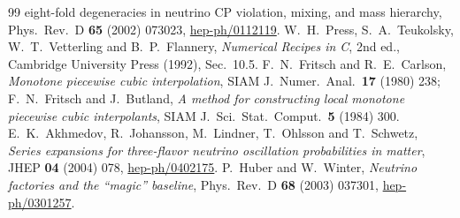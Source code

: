 \documentclass[11pt,a4paper,openany]{book}
\begin{document}
\begin{thebibliography}{99}
{  eight-fold degeneracies in neutrino CP violation, mixing, and mass hierarchy},
  Phys.\ Rev.\ D \textbf{65} (2002) 073023,
  \href{https://arxiv.org/abs/hep-ph/0112119}{hep-ph/0112119}.
 W.~H.~Press, S.~A.~Teukolsky, W.~T.~Vetterling and B.~P.~Flannery,
  \emph{Numerical Recipes in C}, 2nd ed., Cambridge University Press (1992),
  Sec.~10.5.
 F.~N.~Fritsch and R.~E.~Carlson, \emph{Monotone piecewise
  cubic interpolation}, SIAM J.\ Numer.\ Anal.\ \textbf{17} (1980) 238;
  F.~N.~Fritsch and J.~Butland, \emph{A method for constructing local monotone
  piecewise cubic interpolants}, SIAM J.\ Sci.\ Stat.\ Comput.\ \textbf{5} (1984) 300.
 E.~K.~Akhmedov, R.~Johansson, M.~Lindner, T.~Ohlsson
  and T.~Schwetz, \emph{Series expansions for three-flavor neutrino oscillation
  probabilities in matter}, JHEP \textbf{04} (2004) 078,
  \href{https://arxiv.org/abs/hep-ph/0402175}{hep-ph/0402175}.
 P.~Huber and W.~Winter, \emph{Neutrino factories and the
  ``magic'' baseline}, Phys.\ Rev.\ D \textbf{68} (2003) 037301,
  \href{https://arxiv.org/abs/hep-ph/0301257}{hep-ph/0301257}.
\end{thebibliography}
\end{document}
